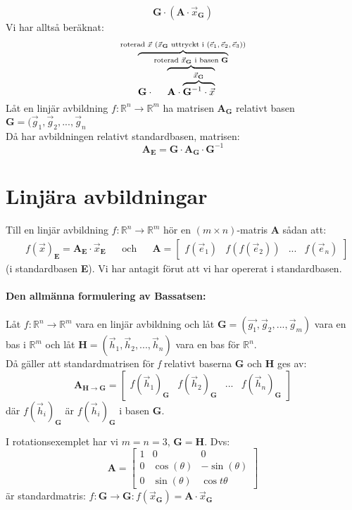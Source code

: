 \[
\mathbf{G} \cdot (\mathbf{A} \cdot \vec{x}_{\mathbf{G}})
\]
Vi har alltså beräknat:
\[
\overbrace{\mathbf{G} \cdot \overbrace{\mathbf{A} \cdot \overbrace{\mathbf{G}^{-1} \cdot \vec{x}}^{\vec{x}_{\mathbf{G}}}}^\text{roterad $\vec{x}_{\mathbf{G}}$ i basen \textbf{G}}}^\text{roterad $\vec{x}$ ($\vec{x}_{\mathbf{G}}$ uttryckt i ($\vec{e}_1, \vec{e}_2, \vec{e}_3$))}
\]
Låt en linjär avbildning $f: \mathbb{R}^n \rightarrow \mathbb{R}^m$ ha matrisen $\mathbf{A}_{\mathbf{G}}$ relativt basen $\mathbf{G} = (\vec{g}_1, \vec{g}_2, ..., \vec{g}_n$\\
Då har avbildningen relativt standardbasen, matrisen:
\[
\mathbf{A}_{\mathbf{E}} = \mathbf{G} \cdot \mathbf{A}_{\mathbf{G}} \cdot \mathbf{G}^{-1}
\]
\section{Linjära avbildningar} %
\label{sec:linj_ra_avbildningar}
Till en linjär avbildning $f: \mathbb{R}^n \rightarrow \mathbb{R}^m$ hör en $(m \times n)$-matris \textbf{A} sådan att:
\begin{align*}
&f(\vec{x})_{\mathbf{E}} = \mathbf{A}_{\mathbf{E}} \cdot \vec{x}_{\mathbf{E}}
&&\mbox{och}
&&\mathbf{A} = \begin{bmatrix} f(\vec{e}_1)&f(f(\vec{e}_2))&...&f(\vec{e}_n) \end{bmatrix}
\end{align*}
(i standardbasen \textbf{E}). Vi har antagit förut att vi har opererat i standardbasen.
\paragraph{Den allmänna formulering av Bassatsen:} %
\label{par:den_allm_nna_formulering_av_bassatsen_}
Låt $f:\mathbb{R}^n \rightarrow \mathbb{R}^m$ vara en linjär avbildning och låt $\mathbf{G} = (\vec{g_1}, \vec{g}_2, ..., \vec{g}_m)$ vara en bas i $\mathbb{R}^m$ och låt $\mathbf{H} = (\vec{h}_1, \vec{h}_2, ..., \vec{h}_n)$ vara en bas för $\mathbb{R}^n$.\\
Då gäller att standardmatrisen för \textit{f} relativt baserna \textbf{G} och \textbf{H} ges av:
\[
 \mathbf{A}_{\mathbf{H} \rightarrow \mathbf{G}} = \begin{bmatrix} f(\vec{h}_1)_{\mathbf{G}} & f(\vec{h}_2)_{\mathbf{G}}&...& f(\vec{h}_n)_{\mathbf{G}} \end{bmatrix}
 \]
 där $f(\vec{h}_i)_{\mathbf{G}}$ är $f(\vec{h}_i)_{\mathbf{G}}$ i basen \textbf{G}.
\begin{Ex}
	I rotationsexemplet har vi $m=n=3$, $\mathbf{G}=\mathbf{H}$. Dvs:
	\[
	\mathbf{A} =
	\begin{bmatrix}
	1 & 0 & 0\\
	0 & \cos(\theta) & -\sin(\theta)\\
	0 & \sin(\theta) & \cos{t\theta}
	\end{bmatrix}
	\]
	är standardmatris: $f: \mathbf{G} \rightarrow \mathbf{G}: f(\vec{x}_{\mathbf{G}}) = \mathbf{A} \cdot \vec{x}_{\mathbf{G}}$
\end{Ex}
